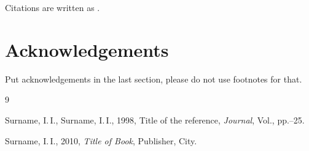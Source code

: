 \documentclass{procDDs}
\begin{document}
 
Citations are written as \cite{paper1}.           %



\section*{Acknowledgements}

Put acknowledgements in the last section, please do not use footnotes for that.


\begin {thebibliography}{9}

 Surname, I.\,I., Surname, I.\,I., 1998,
            Title of the reference,
            \emph{Journal}, Vol., pp.--25.

 Surname, I.\,I., 2010, \textit{Title of Book}, Publisher, City.

\end{thebibliography}
\end{document}
